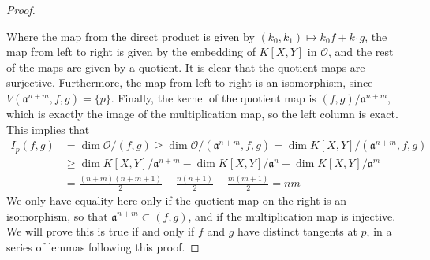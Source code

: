 \begin{proof}
    \begin{center}
    \end{center}
    Where the map from the direct product is given by $(k_0,k_1) \mapsto k_0f + k_1g$, the map from left to right is given by the embedding of $K[X,Y]$ in $\mathcal{O}$, and the rest of the maps are given by a quotient. It is clear that the quotient maps are surjective. Furthermore, the map from left to right is an isomorphism, since $V(\mathfrak{a}^{n+m},f,g) = \{ p \}$. Finally, the kernel of the quotient map is $(f,g)/\mathfrak{a}^{n+m}$, which is exactly the image of the multiplication map, so the left column is exact. This implies that
    \begin{align*}
        I_p(f,g) &= \dim \mathcal{O}/(f,g) \geq \dim \mathcal{O}/(\mathfrak{a}^{n+m},f,g) = \dim K[X,Y]/(\mathfrak{a}^{n+m},f,g)\\
        &\geq \dim K[X,Y]/\mathfrak{a}^{n+m} - \dim K[X,Y]/\mathfrak{a}^n - \dim K[X,Y]/\mathfrak{a}^m\\
        &= \frac{(n+m)(n+m+1)}{2} - \frac{n(n+1)}{2} - \frac{m(m+1)}{2} = nm
    \end{align*}
    We only have equality here only if the quotient map on the right is an isomorphism, so that $\mathfrak{a}^{n+m} \subset (f,g)$, and if the multiplication map is injective. We will prove this is true if and only if $f$ and $g$ have distinct tangents at $p$, in a series of lemmas following this proof.
\end{proof}


